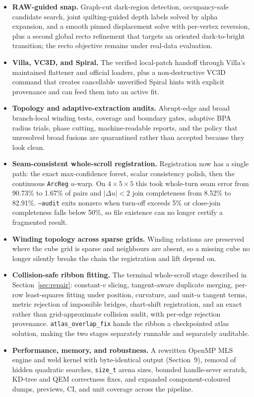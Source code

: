 {\begin{itemize}
  \item \textbf{RAW-guided snap.} Graph-cut dark-region detection, occupancy-safe candidate search, joint quilting-guided depth labels solved by alpha expansion, and a smooth pinned displacement solve with per-vertex reversion, plus a second global recto refinement that targets an oriented dark-to-bright transition; the recto objective remains under real-data evaluation.

  \item \textbf{Villa, VC3D, and Spiral.} The verified local-patch handoff through Villa's maintained flattener and official loaders, plus a non-destructive VC3D command that creates cancellable unverified Spiral hints with explicit provenance and can feed them into an active fit.

  \item \textbf{Topology and adaptive-extraction audits.} Abrupt-edge and broad branch-local winding tests, coverage and boundary gates, adaptive BPA radius trials, phase cutting, machine-readable reports, and the policy that unresolved broad fusions are quarantined rather than accepted because they look clean.

  \item \textbf{Seam-consistent whole-scroll registration.} Registration now has a single path: the exact max-confidence forest, scalar consistency polish, then the continuous \texttt{ArcReg} $u$-warp. On $4\times5\times5$ this took whole-turn seam error from 90.73\% to 1.67\% of pairs and $|\Delta u| < 2$ join completeness from 8.52\% to 82.91\%. \texttt{--audit} exits nonzero when turn-off exceeds 5\% or close-join completeness falls below 50\%, so file existence can no longer certify a fragmented result.

  \item \textbf{Winding topology across sparse grids.} Winding relations are preserved where the cube grid is sparse and neighbours are absent, so a missing cube no longer silently breaks the chain the registration and lift depend on.

  \item \textbf{Collision-safe ribbon fitting.} The terminal whole-scroll stage described in Section~\ref{sec:repair}: constant-$v$ slicing, tangent-aware duplicate merging, per-row least-squares fitting under position, curvature, and unit-$u$ tangent terms, metric rejection of impossible bridges, chart-shift registration, and an exact rather than grid-approximate collision audit, with per-edge rejection provenance. \texttt{atlas\_overlap\_fix} hands the ribbon a checkpointed atlas solution, making the two stages separately runnable and separately auditable.

  \item \textbf{Performance, memory, and robustness.} A rewritten OpenMP MLS engine and weld kernel with byte-identical output (Section~9), removal of hidden quadratic searches, \texttt{size\_t} arena sizes, bounded handle-sever scratch, KD-tree and QEM correctness fixes, and expanded component-coloured dumps, previews, CI, and unit coverage across the pipeline.
\end{itemize}
}


